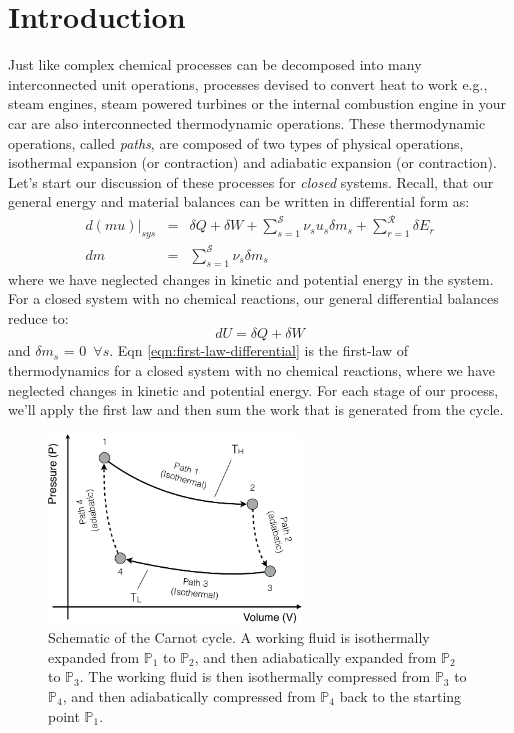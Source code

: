 \documentclass[11pt]{article}
\theoremstyle{definition}
\begin{document}
\clearpage

\section*{Introduction}
Just like complex chemical processes can be decomposed into many interconnected unit operations,
processes devised to convert heat to work e.g., steam engines, steam powered turbines or the internal combustion engine in your car
are also interconnected thermodynamic operations. These thermodynamic operations, called \textit{paths}, are composed of two types of physical operations, isothermal expansion (or contraction) and adiabatic expansion (or contraction). Let's start our discussion of these processes for \textit{closed} systems. Recall, that our general energy and material balances can be written in
differential form as:
\begin{eqnarray}\label{eqn:energy-balance-precursor-internal}
d\left(mu\right)\Bigr|_{sys} &=& \delta{Q}+\delta{W}+\sum_{s=1}^{\mathcal{S}}\nu_{s}u_{s}\delta{m}_{s} + \sum_{r=1}^{\mathcal{R}}\delta E_{r}\\\label{eqn:material-balance-precursor-internal}
dm &=& \sum_{s=1}^{\mathcal{S}}\nu_{s}\delta{m}_{s}
\end{eqnarray}where we have neglected changes in kinetic and potential energy in the system. For a closed system with no chemical reactions, our general differential balances reduce to:
\begin{equation}\label{eqn:first-law-differential}
dU = \delta{Q}+\delta{W}
\end{equation}and $\delta{m}_{s}$ = 0~$\forall{s}$. Eqn \eqref{eqn:first-law-differential} is the first-law of thermodynamics for a closed system with no chemical reactions,
where we have neglected changes in kinetic and potential energy. For each stage of our process, we'll apply the first law and then sum the work that is generated from the cycle.

\begin{figure}[!ht]\centering
\includegraphics[width=0.6\textwidth]{./figs/CarnotCycle.pdf}
\caption{Schematic of the Carnot cycle. A working fluid is isothermally expanded from $\mathbb{P}_1$ to $\mathbb{P}_2$, and then adiabatically expanded from $\mathbb{P}_2$ to $\mathbb{P}_3$. The working fluid is then isothermally compressed from $\mathbb{P}_3$ to $\mathbb{P}_4$, and then adiabatically compressed from $\mathbb{P}_4$ back to the starting point $\mathbb{P}_1$.}\label{fig-carnot-cycle}
\end{figure}
\end{document}
